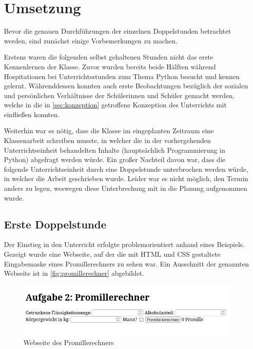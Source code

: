 \section{Umsetzung}
\label{sec:umsetzung}

Bevor die genauen Durchführungen der einzelnen Doppelstunden betrachtet werden, sind zunächst einige Vorbemerkungen zu machen.

Erstens waren die folgenden selbst gehaltenen Stunden nicht das erste Kennenlernen der Klasse.
Zuvor wurden bereits beide Hälften während Hospitationen bei Unterrichtsstunden zum Thema Python besucht und kennen gelernt.
Währenddessen konnten auch erste Beobachtungen bezüglich der sozialen und persönlichen Verhältnisse der Schülerinnen und Schüler gemacht werden, welche in die in \autoref{sec:konzeption} getroffene Konzeption des Unterrichts mit einfließen konnten.

Weiterhin war es nötig, dass die Klasse im eingeplanten Zeitraum eine Klassenarbeit schreiben musste, in welcher die in der vorhergehenden Unterrichtseinheit behandelten Inhalte (hauptsächlich Programmierung in Python) abgefragt werden würde.
Ein großer Nachteil davon war, dass die folgende Unterrichtseinheit durch eine Doppelstunde unterbrochen werden würde, in welcher die Arbeit geschrieben wurde.
Leider war es nicht möglich, den Termin anders zu legen, weswegen diese Unterbrechung mit in die Planung aufgenommen wurde.


\subsection{Erste Doppelstunde}
\label{subsec:doppelstunde-1}

Der Einstieg in den Unterricht erfolgte problemorientiert anhand eines Beispiels.
Gezeigt wurde eine Webseite, auf der die mit HTML und CSS gestaltete Eingabemaske eines Promillerechners zu sehen war.
Ein Ausschnitt der genannten Webseite ist in \autoref{fig:promillerechner} abgebildet.

\begin{figure}[h!]
	\centering
	\includegraphics[width=\textwidth]{media/Promillerechner.png}
	\caption{Webseite des Promillerechners}
	\label{fig:promillerechner}
\end{figure}

